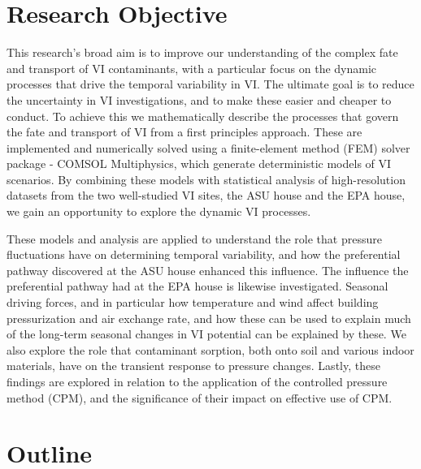 \documentclass[../thesis.tex]{subfiles}
\begin{document}



\section{Research Objective}

This research's broad aim is to improve our understanding of the complex fate and transport of VI contaminants, with a particular focus on the dynamic processes that drive the temporal variability in VI.
The ultimate goal is to reduce the uncertainty in VI investigations, and to make these easier and cheaper to conduct.
To achieve this we mathematically describe the processes that govern the fate and transport of VI from a first principles approach.
These are implemented and numerically solved using a finite-element method (FEM) solver package - COMSOL Multiphysics, which generate deterministic models of VI scenarios.
By combining these models with statistical analysis of high-resolution datasets from the two well-studied VI sites, the ASU house and the EPA house, we gain an opportunity to explore the dynamic VI processes.\par

These models and analysis are applied to understand the role that pressure fluctuations have on determining temporal variability, and how the preferential pathway discovered at the ASU house enhanced this influence.
The influence the preferential pathway had at the EPA house is likewise investigated.
Seasonal driving forces, and in particular how temperature and wind affect building pressurization and air exchange rate, and how these can be used to explain much of the long-term seasonal changes in VI potential can be explained by these.
We also explore the role that contaminant sorption, both onto soil and various indoor materials, have on the transient response to pressure changes.
Lastly, these findings are explored in relation to the application of the controlled pressure method (CPM), and the significance of their impact on effective use of CPM.\par

\section{Outline}




\end{document}
